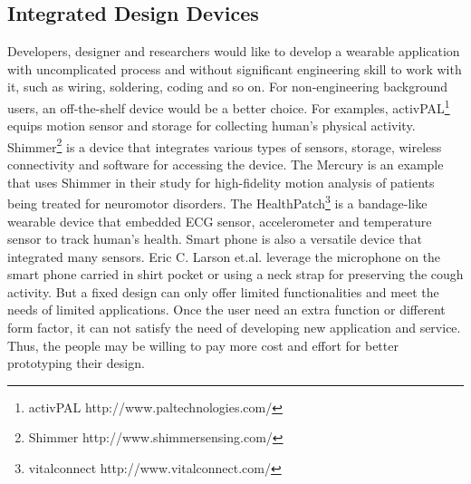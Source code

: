 \subsection{Integrated Design Devices}
Developers, designer and researchers would like to develop a wearable application with uncomplicated process and without significant engineering skill to work with it, such as wiring, soldering, coding and so on. For non-engineering background users, an off-the-shelf device would be a better choice. For examples, activPAL\footnote{activPAL
\hspace{1cm} http://www.paltechnologies.com/} equips motion sensor and storage for collecting human's physical activity. Shimmer\footnote{Shimmer
\hspace{1cm} http://www.shimmersensing.com/} is a device that integrates various types of sensors, storage, wireless connectivity and software for accessing the device. The Mercury \cite{Lorincz:2009:MWS:1644038.1644057} is an example that uses Shimmer in their study for high-fidelity motion analysis of patients being treated for neuromotor disorders. The HealthPatch\footnote{vitalconnect
\hspace{1cm} http://www.vitalconnect.com/} is a bandage-like wearable device that embedded ECG sensor, accelerometer and temperature sensor to track human's health.
Smart phone is also a versatile device that integrated many sensors. 
Eric C. Larson et.al.\cite{Larson:2011:APP:2030112.2030163} leverage the microphone on the smart phone carried in shirt pocket or using a neck strap for preserving the cough activity.
But a fixed design can only offer limited functionalities and meet the needs of limited applications. Once the user need an extra function or different form factor, it can not satisfy the need of developing new application and service. Thus, the people may be willing to pay more cost and effort for better prototyping their design.


